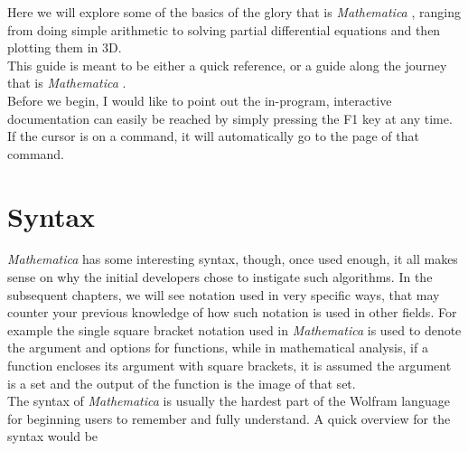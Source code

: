 \documentclass[11pt,letterpaper,twoside,titlepage]{report}
\newcommand{\Mathematica}{\textit{Mathematica} }
\begin{document}
		Here we will explore some of the basics of the glory that is \Mathematica, ranging from doing simple arithmetic to solving partial differential equations and then plotting them in 3D. \\
		
		This guide is meant to be either a quick reference, or a guide along the journey that is \Mathematica. \\
		
		Before we begin, I would like to point out the in-program, interactive documentation can easily be reached by simply pressing the F1 key at any time.  If the cursor is on a command, it will automatically go to the page of that command.
	
	\tableofcontents

	\part{Syntax}
	
		\Mathematica has some interesting syntax, though, once used enough, it all makes sense on why the initial developers chose to instigate such algorithms.  In the subsequent chapters, we will see notation used in very specific ways, that may counter your previous knowledge of how such notation is used in other fields.  For example the single square bracket notation used in \Mathematica is used to denote the argument and options for functions, while in mathematical analysis, if a function encloses its argument with square brackets, it is assumed the argument is a set and the output of the function is the image of that set. \\
		
		The syntax of \Mathematica is usually the hardest part of the Wolfram language for beginning users to remember and fully understand.  A quick overview for the syntax would be
		
\end{document}
